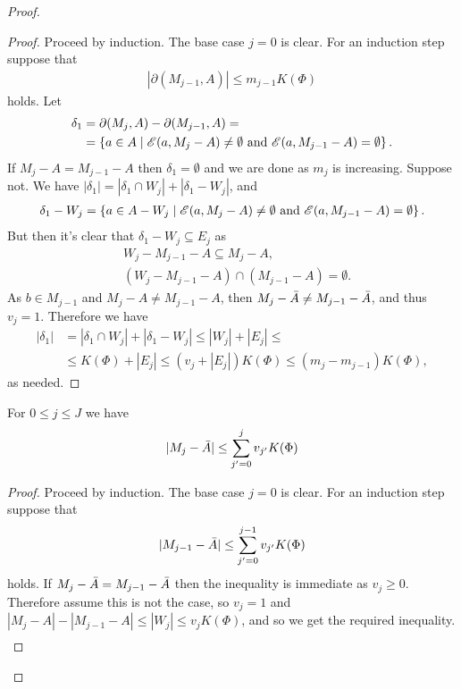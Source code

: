 \documentclass{amsart}
\begin{document}
\begin{proof}
  \begin{proof} %
    Proceed by induction. The base case $j = 0$ is clear.
    For an induction step suppose that
    \begin{align*}
      |\partial(M_{j-1}, A)| \leq m_{j-1}  K(\Phi)
    \end{align*}
    holds.
    Let
    \begin{align*}
      \delta_1 &= \partial(M_j, A) - \partial(M_{j-1}, A) = \\
               &=\left\{a \in A \mid  \mathscr E(a, M_j - A) \neq \emptyset \text{ and } \mathscr E(a, M_{j-1} - A) = \emptyset\right\}.
    \end{align*}
    If $M_j - A = M_{j-1} - A$ then $\delta_1 = \emptyset$ and we are done as $m_j$ is increasing.
    Suppose not.
    We have $|\delta_1| = |\delta_1 \cap W_j| + |\delta_1 - W_j|$, and
    \begin{align*}
      \delta_1 - W_j = \left\{a \in A - W_j \mid \mathscr E(a, M_j - A) \neq \emptyset \text{ and } \mathscr E(a, M_{j-1} - A) = \emptyset\right\}.
    \end{align*}
    But then it's clear that $\delta_1 - W_j \subseteq E_j$ as
    \begin{align*}
      &W_j - M_{j-1} - A \subseteq M_j - A, \\
      &(W_j - M_{j-1} - A) \cap (M_{j-1} - A) = \emptyset.
    \end{align*}
    As $b \in M_{j-1}$ and $M_j - A \neq M_{j-1} - A$, then $M_j - \bar A \neq M_{j-1} - \bar A$, and thus $v_j = 1$. 
    Therefore we have
    \begin{align*}
      |\delta_1| &= |\delta_1 \cap W_j| + |\delta_1 - W_j| \leq |W_j| + |E_j| \leq \\
      &\leq K(\Phi) + |E_j|
      \leq (v_j + |E_j|) K(\Phi)  \leq (m_j - m_{j-1}) K(\Phi),
    \end{align*}
    as needed.
  \end{proof}

  \begin{Lemma} \label{ub_lemma}
    For $0 \leq j \leq J$ we have
    \begin{align*}
      |M_j - \bar A| \leq \sum_{j'=0}^j v_{j'} K(\Phi)
    \end{align*}
  \end{Lemma}

  \begin{proof} %
    Proceed by induction. The base case $j = 0$ is clear.
    For an induction step suppose that
    \begin{align*}
      |M_{j-1} - \bar A| \leq \sum_{j'=0}^{j-1} v_{j'} K(\Phi)
    \end{align*}
    holds.
    If $M_j - \bar A = M_{j-1} - \bar A$ then the inequality is immediate as $v_j \geq 0$.
    Therefore assume this is not the case, so $v_j = 1$ and $|M_j - A| - |M_{j-1} - A| \leq |W_j| \leq v_j K(\Phi)$, and so we get the required inequality.
    \begin{align*}
    \end{align*}
  \end{proof}
  

\end{proof}
\end{document}
